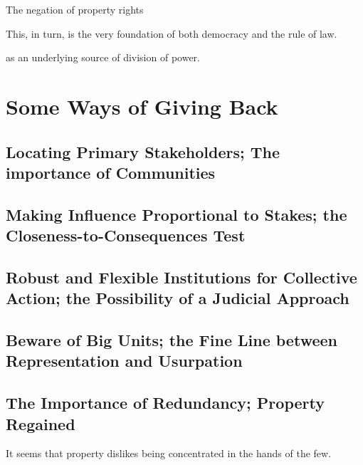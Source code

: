 {The negation of property rights

This, in turn, is the very foundation of both democracy and the rule of law.



 as an underlying source of division of power.


 
\section{Some Ways of Giving Back}

\subsection{Locating Primary Stakeholders; The importance of Communities}

\subsection{Making Influence Proportional to Stakes; the Closeness-to-Consequences Test}

\subsection{Robust and Flexible Institutions for Collective Action; the Possibility of a Judicial Approach}

\subsection{Beware of Big Units; the Fine Line between Representation and Usurpation}

\subsection{The Importance of Redundancy; Property Regained}

It seems that property dislikes being concentrated in the hands of the few. }